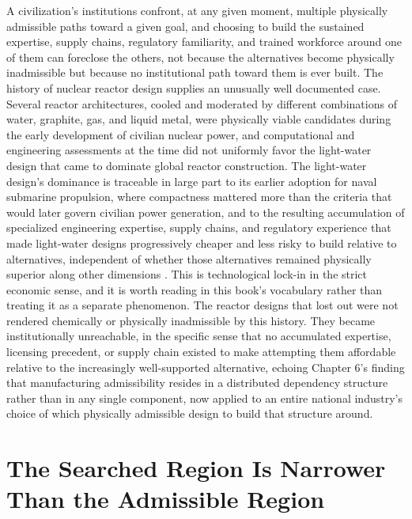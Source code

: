 \documentclass[11pt]{book}
\begin{document}
A civilization's institutions confront, at any given moment, multiple physically admissible paths toward a given goal, and choosing to build the sustained expertise, supply chains, regulatory familiarity, and trained workforce around one of them can foreclose the others, not because the alternatives become physically inadmissible but because no institutional path toward them is ever built. The history of nuclear reactor design supplies an unusually well documented case. Several reactor architectures, cooled and moderated by different combinations of water, graphite, gas, and liquid metal, were physically viable candidates during the early development of civilian nuclear power, and computational and engineering assessments at the time did not uniformly favor the light-water design that came to dominate global reactor construction. The light-water design's dominance is traceable in large part to its earlier adoption for naval submarine propulsion, where compactness mattered more than the criteria that would later govern civilian power generation, and to the resulting accumulation of specialized engineering expertise, supply chains, and regulatory experience that made light-water designs progressively cheaper and less risky to build relative to alternatives, independent of whether those alternatives remained physically superior along other dimensions \cite{cowan1990}. This is technological lock-in in the strict economic sense, and it is worth reading in this book's vocabulary rather than treating it as a separate phenomenon. The reactor designs that lost out were not rendered chemically or physically inadmissible by this history. They became institutionally unreachable, in the specific sense that no accumulated expertise, licensing precedent, or supply chain existed to make attempting them affordable relative to the increasingly well-supported alternative, echoing Chapter 6's finding that manufacturing admissibility resides in a distributed dependency structure rather than in any single component, now applied to an entire national industry's choice of which physically admissible design to build that structure around.

\section{The Searched Region Is Narrower Than the Admissible Region}
\end{document}
